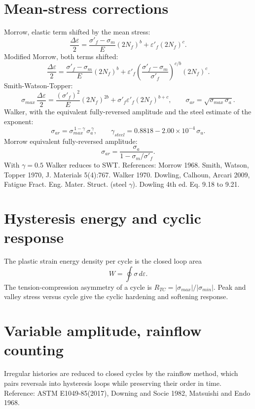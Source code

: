 \documentclass[11pt]{article}
\begin{document}
\section{Mean-stress corrections}
Morrow, elastic term shifted by the mean stress:
\begin{equation}
\frac{\Delta\varepsilon}{2} = \frac{\sigma'_f-\sigma_m}{E}(2N_f)^{b} + \varepsilon'_f (2N_f)^{c}.
\end{equation}
Modified Morrow, both terms shifted:
\begin{equation}
\frac{\Delta\varepsilon}{2} = \frac{\sigma'_f-\sigma_m}{E}(2N_f)^{b}
+ \varepsilon'_f\left(\frac{\sigma'_f-\sigma_m}{\sigma'_f}\right)^{c/b}(2N_f)^{c}.
\end{equation}
Smith-Watson-Topper:
\begin{equation}
\sigma_{max}\,\frac{\Delta\varepsilon}{2} = \frac{(\sigma'_f)^2}{E}(2N_f)^{2b}
+ \sigma'_f \varepsilon'_f (2N_f)^{b+c},
\qquad
\sigma_{ar} = \sqrt{\sigma_{max}\,\sigma_a}.
\end{equation}
Walker, with the equivalent fully-reversed amplitude and the steel estimate of
the exponent:
\begin{equation}
\sigma_{ar} = \sigma_{max}^{\,1-\gamma}\,\sigma_a^{\,\gamma},
\qquad
\gamma_{steel} = 0.8818 - 2.00\times10^{-4}\,\sigma_u.
\end{equation}
Morrow equivalent fully-reversed amplitude:
\begin{equation}
\sigma_{ar} = \frac{\sigma_a}{1 - \sigma_m/\sigma'_f}.
\end{equation}
With \(\gamma=0.5\) Walker reduces to SWT. References: Morrow 1968. Smith, Watson,
Topper 1970, J. Materials 5(4):767. Walker 1970. Dowling, Calhoun, Arcari 2009,
Fatigue Fract. Eng. Mater. Struct. (steel \(\gamma\)). Dowling 4th ed. Eq. 9.18 to 9.21.

\section{Hysteresis energy and cyclic response}
The plastic strain energy density per cycle is the closed loop area
\begin{equation}
W = \oint \sigma\,d\varepsilon.
\end{equation}
The tension-compression asymmetry of a cycle is
\(R_{TC} = \lvert\sigma_{max}\rvert / \lvert\sigma_{min}\rvert\). Peak and valley
stress versus cycle give the cyclic hardening and softening response.

\section{Variable amplitude, rainflow counting}
Irregular histories are reduced to closed cycles by the rainflow method, which
pairs reversals into hysteresis loops while preserving their order in time.
Reference: ASTM E1049-85(2017), Downing and Socie 1982, Matsuishi and Endo 1968.
\end{document}
